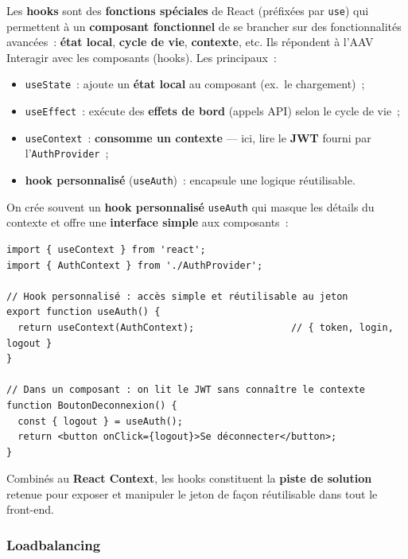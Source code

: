 \noindent Les \textbf{hooks} sont des \textbf{fonctions spéciales} de React (préfixées par \texttt{use}) qui permettent à un \textbf{composant fonctionnel} de \og{}se brancher\fg{} sur des fonctionnalités avancées~: \textbf{état local}, \textbf{cycle de vie}, \textbf{contexte}, etc. Ils répondent à l'AAV \og{}Interagir avec les composants (hooks)\fg{}. Les principaux~:
\begin{itemize}
	\item \texttt{useState}~: ajoute un \textbf{état local} au composant (ex.~le chargement)~;
	\item \texttt{useEffect}~: exécute des \textbf{effets de bord} (appels API) selon le cycle de vie~;
	\item \texttt{useContext}~: \textbf{consomme un contexte} — ici, lire le \textbf{JWT} fourni par l'\texttt{AuthProvider}~;
	\item \textbf{hook personnalisé} (\texttt{useAuth})~: encapsule une logique réutilisable.
\end{itemize}
\noindent On crée souvent un \textbf{hook personnalisé} \texttt{useAuth} qui masque les détails du contexte et offre une \textbf{interface simple} aux composants~:
\begin{verbatim}
import { useContext } from 'react';
import { AuthContext } from './AuthProvider';

// Hook personnalisé : accès simple et réutilisable au jeton
export function useAuth() {
  return useContext(AuthContext);                 // { token, login, logout }
}

// Dans un composant : on lit le JWT sans connaître le contexte
function BoutonDeconnexion() {
  const { logout } = useAuth();
  return <button onClick={logout}>Se déconnecter</button>;
}
\end{verbatim}
\noindent Combinés au \textbf{React Context}, les hooks constituent la \textbf{piste de solution} retenue pour exposer et manipuler le jeton de façon réutilisable dans tout le front-end.

\vspace{0.4cm}

\subsubsection*{Loadbalancing}
{}

